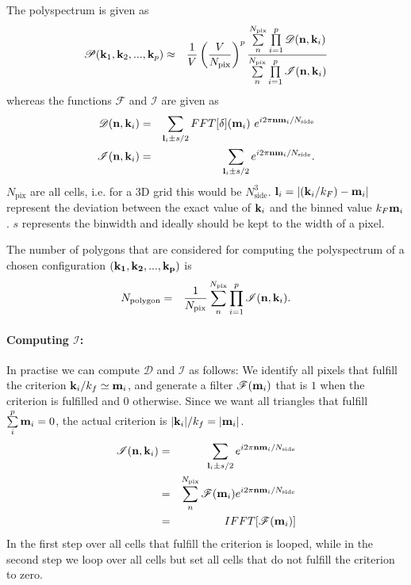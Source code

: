 \documentclass[twoside,10pt]{article}
\begin{document}
\begin{multicols}{2}
The polyspectrum is given as
\begin{eqnarray}
 \mathscr{P}({\bf k}_1, {\bf k}_2, ..., {\bf k}_p) &\approx& \frac{1}{V} \left(\frac{V}{N_\mathrm{pix}}\right)^{p}  \frac{\sum\limits_{n}^{N_\mathrm{pix}} \prod\limits_{i=1}^p \mathscr{D}({\bf n}, {\bf k}_i)}{\sum\limits_{n}^{N_\mathrm{pix}} \prod\limits_{i=1}^p \mathscr{I}({\bf n}, {\bf k}_i)}
\end{eqnarray}
whereas the functions $\mathscr{F}$ and $\mathscr{I}$ are given as
\begin{eqnarray}
 \mathscr{D} ({\bf n}, {\bf k}_i) &=& \sum\limits_{{\bf l}_i\pm s/2} FFT[\delta]({\bf m}_i)\ e^{i 2 \pi {\bf n} {\bf m}_i / N_\mathrm{side}}\\
 \mathscr{I} ({\bf n}, {\bf k}_i) &=& \sum\limits_{{\bf l}_i\pm s/2} e^{i 2 \pi {\bf n} {\bf m}_i / N_\mathrm{side}}.
\end{eqnarray}
$N_\mathrm{pix}$ are all cells, i.e. for a 3D grid this would be $N_\mathrm{side}^3$.
${\bf l}_i = |({\bf k}_i/k_F)-{\bf m}_i|$ represent the deviation between the exact value of ${\bf k}_i$ and the binned value $k_F {\bf m}_i$. $s$ represents the binwidth and ideally should be kept to the width of a pixel.

The number of polygons that are considered for computing the polyspectrum of a chosen configuration $({\bf k_1}, {\bf k_2},..., {\bf k_p})$ is 
\begin{eqnarray}
 N_\mathrm{polygon} &=& \frac{1}{N_\mathrm{pix}} \sum\limits_{n}^{N_\mathrm{pix}} \prod\limits_{i=1}^p \mathscr{I}({\bf n}, {\bf k}_i).
\end{eqnarray}

\paragraph{Computing $\mathscr{I}$:}

In practise we can compute $\mathscr{D}$ and $\mathscr{I}$ as follows: We identify all pixels that fulfill the criterion ${\bf k}_i/k_f \simeq {\bf m}_i$, and generate a filter $\mathscr{F}({\bf m}_i)$ that is $1$ when the criterion is fulfilled and $0$ otherwise. Since we want all triangles that fulfill $\sum\limits_i^p {\bf m}_i=0$, the actual criterion is $|{\bf k}_i|/k_f = |{\bf m}_i|$.
\begin{eqnarray}
 \mathscr{I} ({\bf n}, {\bf k}_i) &=& \sum\limits_{{\bf l}_i\pm s/2} e^{i 2 \pi {\bf n} {\bf m}_i / N_\mathrm{side}} \nonumber \\
 &=& \sum\limits_{n}^{N_\mathrm{pix}} \mathscr{F}({\bf m}_i) e^{i 2 \pi {\bf n} {\bf m}_i / N_\mathrm{side}} \nonumber \\
 &=& IFFT[\mathscr{F}({\bf m}_i)]
\end{eqnarray}
In the first step over all cells that fulfill the criterion is looped, while in the second step we loop over all cells but set all cells that do not fulfill the criterion to zero.


\end{multicols}
\end{document}
